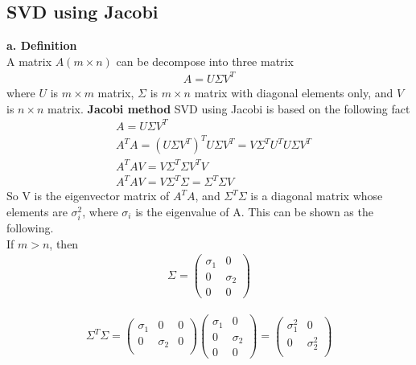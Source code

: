 \documentclass[a4paper]{article}
\begin{document}
\subsection{SVD using Jacobi}
{\bf a. Definition}\\
A matrix $A(m \times n)$ can be decompose into three matrix
\begin{align*}
	A = U \Sigma V^T
\end{align*}
where $U$ is $m \times m$ matrix, $\Sigma$ is $m \times n$ matrix with diagonal elements only, and $V$ is $n \times n$ matrix.
{\bf Jacobi method}
SVD using Jacobi is based on the following fact
\begin{align*}
	& A = U \Sigma V^T \\
	& A^T A = (U \Sigma V^T)^T U \Sigma V^T = V \Sigma^T U^T U\Sigma V^T \\
	& A^T A V = V \Sigma^T \Sigma V^T V \\
	& A^T A V = V \Sigma^T \Sigma = \Sigma^T \Sigma V
\end{align*}
So V is the eigenvector matrix of $A^T A$, and $\Sigma^T \Sigma$ is a diagonal matrix whose elements are $\sigma_i^2$, where $\sigma_i$ is the eigenvalue of A. This can be shown as the following.\\
If $m >n $, then\\
\begin{align*}
	\Sigma = \left(  \begin{array} {cc}
		\sigma_1 & 0 \\
		0 & \sigma_2\\
		0 & 0
	\end{array} \right)
\end{align*}

\begin{align*}
	\Sigma^T \Sigma = \left(  \begin{array} {ccc}
		\sigma_1 & 0 & 0 \\
		0 & \sigma_2 & 0\\
	\end{array} \right)
	\left(  \begin{array} {cc}
		\sigma_1 & 0 \\
		0 & \sigma_2\\
		0 & 0
	\end{array} \right)
	= \left(  \begin{array} {cc}
		\sigma_1^2 & 0 \\
		0 & \sigma_2^2\\
	\end{array} \right)
\end{align*}	
\end{document}
